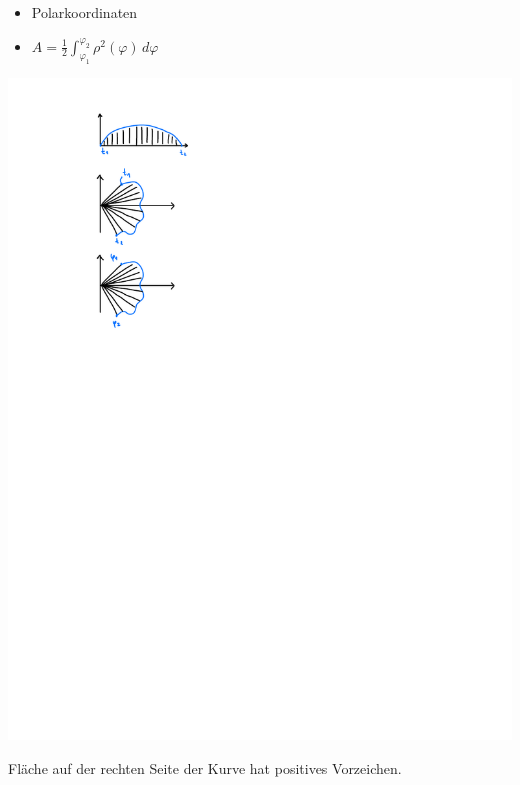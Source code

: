         \begin{minipage}{0.99\linewidth}
            \begin{minipage}{0.65\linewidth}
                \begin{itemize}
                    \item Polarkoordinaten
                    \item[] $ \displaystyle A= \frac{1}{2} \int_{\varphi_1}^{\varphi_2} \rho^2(\varphi) \, d\varphi $
                \end{itemize}
            \end{minipage}
            \begin{minipage}{0.34\linewidth}
                \includegraphics[width=0.6\linewidth]{src/11_Integralrechnung/polar.pdf}
            \end{minipage}
        \end{minipage}
        {\scriptsize Fläche auf der rechten Seite der Kurve hat positives Vorzeichen.}